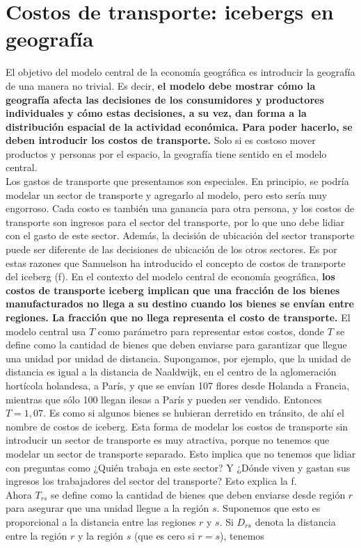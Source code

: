 \section{Costos de transporte: icebergs en geografía}
El objetivo del modelo central de la economía geográfica es introducir la geografía de una manera no trivial. Es decir, \textbf{el modelo debe mostrar cómo la geografía afecta las decisiones de los consumidores y productores individuales y cómo estas decisiones, a su vez, dan forma a la distribución espacial de la actividad económica. Para poder hacerlo, se deben introducir los costos de transporte.} Solo si es costoso mover productos y personas por el espacio, la geografía tiene sentido en el modelo central.\\ 
Los gastos de transporte que presentamos son especiales. En principio, se podría modelar un sector de transporte y agregarlo al modelo, pero esto sería muy engorroso. Cada costo es también una ganancia para otra persona, y los costos de transporte son ingresos para el sector del transporte, por lo que uno debe lidiar con el gasto de este sector. Además, la decisión de ubicación del sector transporte puede ser diferente de las decisiones de ubicación de los otros sectores. Es por estas razones que Samuelson  ha introducido el concepto de costos de transporte del iceberg (f). En el contexto del modelo central de economía geográfica, \textbf{los costos de transporte iceberg implican que una fracción de los bienes manufacturados no llega a su destino cuando los bienes se envían entre regiones. La fracción que no llega representa el costo de transporte.} El modelo central usa $T$ como parámetro para representar estos costos, donde $T$ se define como la cantidad de bienes que deben enviarse para garantizar que llegue una unidad por unidad de distancia. Supongamos, por ejemplo, que la unidad de distancia es igual a la distancia de Naaldwijk, en el centro de la aglomeración hortícola holandesa, a París, y que se envían 107 flores desde Holanda a Francia, mientras que sólo 100 llegan ilesas a París y pueden ser vendido. Entonces $T = 1,07$. Es como si algunos bienes se hubieran derretido en tránsito, de ahí el nombre de costos de iceberg. Esta forma de modelar los costos de transporte sin introducir un sector de transporte es muy atractiva, porque no tenemos que modelar un sector de transporte separado. Esto implica que no tenemos que lidiar con preguntas como ¿Quién trabaja en este sector? Y ¿Dónde viven y gastan sus ingresos los trabajadores del sector del transporte? Esto explica la f.\\
Ahora $T_{rs}$ se define como la cantidad de bienes que deben enviarse desde región $r$ para asegurar que una unidad llegue a la región $s$. Suponemos que esto es proporcional a la distancia entre las regiones $r$ y $s$. Si $D_{rs}$ denota la distancia entre la región $r$ y la región $s$ (que es cero si $r = s$), tenemos

